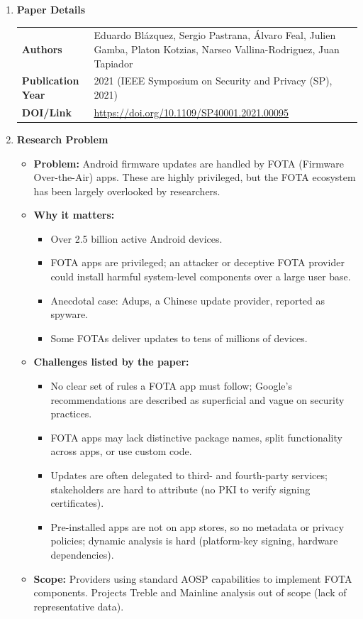 \documentclass[11pt,a4paper]{article}
\newcommand{\entrypart}[1]{\textbf{\color{accent}#1}\par\vspace{2pt}}
\begin{document}
\begin{enumerate}

    \item \entrypart{Paper Details}

    \begin{tabular}{@{}>{\bfseries}p{3.2cm} p{11.5cm}@{}}
        Authors          & Eduardo Bl\'{a}zquez, Sergio Pastrana, \'{A}lvaro Feal, Julien Gamba, Platon Kotzias, Narseo Vallina-Rodriguez, Juan Tapiador \\[2pt]
        Publication Year & 2021 (IEEE Symposium on Security and Privacy (SP), 2021) \\[2pt]
        DOI/Link         & \url{https://doi.org/10.1109/SP40001.2021.00095}
    \end{tabular}

    \item \entrypart{Research Problem}

    \begin{itemize}[leftmargin=*,itemsep=1pt,topsep=2pt]
        \item \textbf{Problem:} Android firmware updates are handled by FOTA (Firmware Over-the-Air) apps. These are highly privileged, but the FOTA ecosystem has been largely overlooked by researchers.
        \item \textbf{Why it matters:}
        \begin{itemize}[itemsep=0pt]
            \item Over 2.5 billion active Android devices.
            \item FOTA apps are privileged; an attacker or deceptive FOTA provider could install harmful system-level components over a large user base.
            \item Anecdotal case: Adups, a Chinese update provider, reported as spyware.
            \item Some FOTAs deliver updates to tens of millions of devices.
        \end{itemize}
        \item \textbf{Challenges listed by the paper:}
        \begin{itemize}[itemsep=0pt]
            \item No clear set of rules a FOTA app must follow; Google's recommendations are described as superficial and vague on security practices.
            \item FOTA apps may lack distinctive package names, split functionality across apps, or use custom code.
            \item Updates are often delegated to third- and fourth-party services; stakeholders are hard to attribute (no PKI to verify signing certificates).
            \item Pre-installed apps are not on app stores, so no metadata or privacy policies; dynamic analysis is hard (platform-key signing, hardware dependencies).
        \end{itemize}
        \item \textbf{Scope:} Providers using standard AOSP capabilities to implement FOTA components. Projects Treble and Mainline analysis out of scope (lack of representative data).
    \end{itemize}


\end{enumerate}
\end{document}
